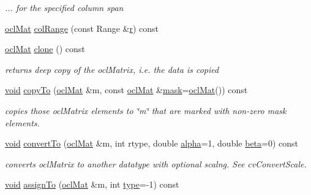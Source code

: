 \begin{DoxyCompactItemize}
\begin{DoxyCompactList}\small\item\em ... for the specified column span \end{DoxyCompactList}\item 
\hyperlink{classcv_1_1ocl_1_1oclMat}{ocl\-Mat} \hyperlink{classcv_1_1ocl_1_1oclMat_aa7ea95ea946e3b85133627dcc748a5fa}{col\-Range} (const Range \&\hyperlink{core__c_8h_a54709f3b06b33b66763f1613cc7fb571}{r}) const 
\item 
\hyperlink{classcv_1_1ocl_1_1oclMat}{ocl\-Mat} \hyperlink{classcv_1_1ocl_1_1oclMat_ab6d0ca3f3b2093abe6325d24dc9cee63}{clone} () const 
\begin{DoxyCompactList}\small\item\em returns deep copy of the ocl\-Matrix, i.\-e. the data is copied \end{DoxyCompactList}\item 
\hyperlink{legacy_8hpp_a8bb47f092d473522721002c86c13b94e}{void} \hyperlink{classcv_1_1ocl_1_1oclMat_af97b3a1bc63dba9143e4eb835dc0bf48}{copy\-To} (\hyperlink{classcv_1_1ocl_1_1oclMat}{ocl\-Mat} \&m, const \hyperlink{classcv_1_1ocl_1_1oclMat}{ocl\-Mat} \&\hyperlink{tracking_8hpp_a6b13ecd2fd6ec7ad422f1d7863c3ad19}{mask}=\hyperlink{classcv_1_1ocl_1_1oclMat}{ocl\-Mat}()) const 
\begin{DoxyCompactList}\small\item\em copies those ocl\-Matrix elements to \char`\"{}m\char`\"{} that are marked with non-\/zero mask elements. \end{DoxyCompactList}\item 
\hyperlink{legacy_8hpp_a8bb47f092d473522721002c86c13b94e}{void} \hyperlink{classcv_1_1ocl_1_1oclMat_a4d11801c217de657e68b784834bdd627}{convert\-To} (\hyperlink{classcv_1_1ocl_1_1oclMat}{ocl\-Mat} \&m, int rtype, double \hyperlink{legacy_8hpp_a95fc8341ca418bc06b36160632af6d47}{alpha}=1, double \hyperlink{legacy_8hpp_af8b31eb489dfbd87f3b1a1925cca3589}{beta}=0) const 
\begin{DoxyCompactList}\small\item\em converts ocl\-Matrix to another datatype with optional scalng. See cv\-Convert\-Scale. \end{DoxyCompactList}\item 
\hyperlink{legacy_8hpp_a8bb47f092d473522721002c86c13b94e}{void} \hyperlink{classcv_1_1ocl_1_1oclMat_aa206f6004efd4fda483bf7a7ca47e9e6}{assign\-To} (\hyperlink{classcv_1_1ocl_1_1oclMat}{ocl\-Mat} \&m, int \hyperlink{classcv_1_1ocl_1_1oclMat_acf6fe0735d1dac151e2c301f01470827}{type}=-\/1) const 

\end{DoxyCompactItemize}
